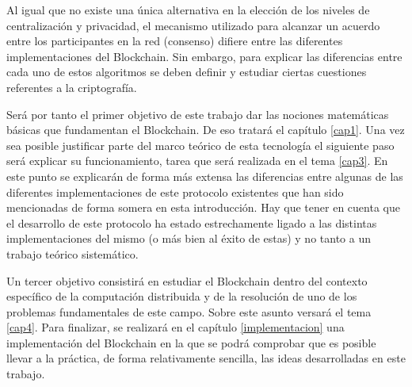 Al igual que no existe una única alternativa en la elección de los niveles de centralización y privacidad, el mecanismo utilizado para alcanzar un acuerdo entre los participantes en la red (consenso) difiere entre las diferentes implementaciones del Blockchain. Sin embargo, para explicar las diferencias entre cada uno de estos algoritmos se deben definir y estudiar ciertas cuestiones referentes a la criptografía.%

Será por tanto el primer objetivo de este trabajo dar las nociones matemáticas básicas que fundamentan el Blockchain. De eso tratará el capítulo \ref{cap1}. Una vez sea posible justificar parte del marco teórico de esta tecnología el siguiente paso será explicar su funcionamiento, tarea que será realizada en el tema \ref{cap3}. En este punto se explicarán de forma más extensa las diferencias entre algunas de las diferentes implementaciones de este protocolo existentes que han sido mencionadas de forma somera en esta introducción. Hay que tener en cuenta que el desarrollo de este protocolo ha estado estrechamente ligado a las distintas implementaciones del mismo (o más bien al éxito de estas) y no tanto a un trabajo teórico sistemático. 

Un tercer objetivo consistirá en estudiar el Blockchain dentro del contexto específico de la computación distribuida y de la resolución de uno de los problemas fundamentales de este campo. Sobre este asunto versará el tema \ref{cap4}. Para finalizar, se realizará en el capítulo \ref{implementacion} una implementación del Blockchain en la que se podrá comprobar que es posible llevar a la práctica, de forma relativamente sencilla, las ideas desarrolladas en este trabajo.









